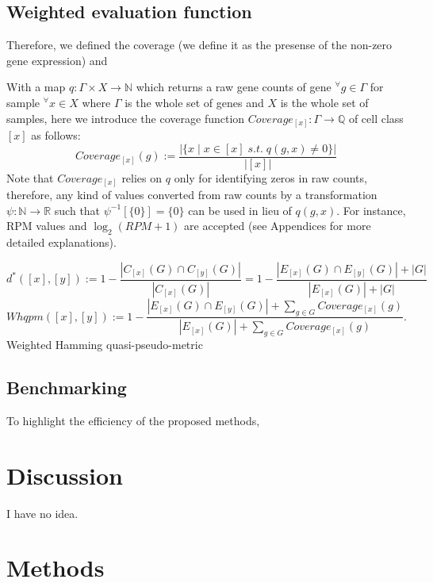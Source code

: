 \documentclass{article}
\begin{document}
\subsection*{Weighted evaluation function}
Therefore, we defined the coverage (we define it as the presense of the 
non-zero gene expression) and

With a map $q: \Gamma\times X\rightarrow \mathbb{N}$ which returns a raw gene counts
of gene $^\forall g\in\Gamma$ for sample $^\forall x\in X$ where $\Gamma$ is the whole set of genes 
and $X$ is the whole set of samples, here we introduce the coverage function $Coverage_{[x]}: \Gamma\rightarrow\mathbb{Q}$ 
of cell class $[x]$ as follows:
\begin{equation}\label{coverage}
  Coverage_{[x]}(g):=\frac{
    |\{x\;|\;x\in[x]\;s.t.\;q(g,x)\neq 0\}|
  }{
    |[x]|
  }
\end{equation}
Note that $Coverage_{[x]}$ relies on $q$ only for identifying zeros in raw counts, therefore, 
any kind of values converted from raw counts by a transformation $\psi: \mathbb{N}\rightarrow\mathbb{R}$ 
such that $\psi^{-1}[\{0\}]=\{0\}$ can be used in lieu of $q(g, x)$. For instance, \ac{RPM} values 
and $\log_2(RPM+1)$ are accepted (see Appendices for more detailed explanations).

\begin{equation}\label{HQPM}
  d^*([x], [y]) := 1 - \frac{|C_{[x]}(G)\cap C_{[y]}(G)|}{|C_{[x]}(G)|}
  =1 - \frac{
    |E_{[x]}(G)\cap E_{[y]}(G)|+|G|
  }{
    |E_{[x]}(G)|+|G|
  }
\end{equation}
\begin{equation}\label{WHQPM}
  Whqpm([x], [y]) := 1 - \frac{
    |E_{[x]}(G)\cap E_{[y]}(G)|+\sum_{g\in G}Coverage_{[x]}(g)
  }{
    |E_{[x]}(G)|+\sum_{g\in G}Coverage_{[x]}(g)
  }.
\end{equation}
Weighted Hamming quasi-pseudo-metric

\subsection*{Benchmarking}
To highlight the efficiency of the proposed methods, 

\section*{Discussion}
I have no idea.

\section*{Methods}
\end{document}
